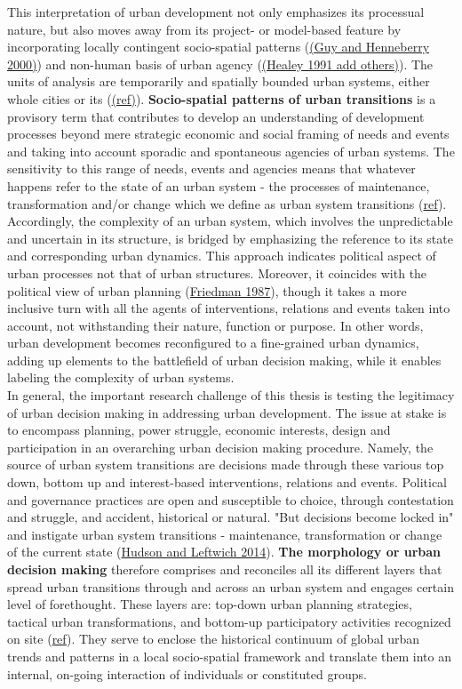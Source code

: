\documentclass[11pt]{report}
\begin{document}
This interpretation of urban development not only emphasizes its processual nature, but also moves away from its project- or model-based feature by incorporating locally contingent socio-spatial patterns (\href{ref}{(Guy and Henneberry 2000)}) and non-human basis of urban agency (\href{ref}{(Healey 1991 add others)}). The units of analysis are temporarily and spatially bounded urban systems, either whole cities or its  (\href{ref}{(ref)}). \textbf{Socio-spatial patterns of urban transitions} is a provisory term  that contributes to develop an understanding of development processes beyond mere strategic economic and social framing of needs and events and taking into account sporadic and spontaneous agencies of urban systems. The sensitivity to this range of needs, events and agencies means that whatever happens refer to the state of an urban system - the processes of maintenance, transformation and/or change which we define as urban system transitions (\href{ref}{ref}). Accordingly, the complexity of an urban system, which involves the unpredictable and uncertain in its structure, is bridged by emphasizing the reference to its state and corresponding urban dynamics. This approach indicates political aspect of urban processes not that of urban structures. Moreover, it coincides with the political view of urban planning (\href{ref}{Friedman 1987}), though it takes a more inclusive turn with all the agents of interventions, relations and events taken into account, not withstanding their nature, function or purpose. In other words, urban development becomes reconfigured to a fine-grained urban dynamics, adding up elements to the battlefield of urban decision making, while it enables labeling the complexity of urban systems.
\\
In general, the important research challenge of this thesis is testing the legitimacy of urban decision making in addressing urban development. The issue at stake is to encompass planning, power struggle, economic interests, design and participation in an overarching urban decision making procedure. Namely, the source of urban system transitions are decisions made through these various top down, bottom up and interest-based interventions, relations and events. Political and governance practices are open and susceptible to choice, through contestation and struggle, and accident, historical or natural. "But decisions become locked in" and instigate urban system transitions - maintenance, transformation or change of the current state (\href{ref}{Hudson and Leftwich 2014}). \textbf{The morphology or urban decision making} therefore comprises and reconciles all its different layers that spread urban transitions through and across an urban system and engages certain level of forethought. These layers are: top-down urban planning strategies, tactical urban transformations, and bottom-up participatory activities recognized on site (\href{ref}{ref}). They serve to enclose the historical continuum of global urban trends and patterns in a local socio-spatial framework and translate them into an internal, on-going interaction of individuals or constituted groups.
\end{document}

